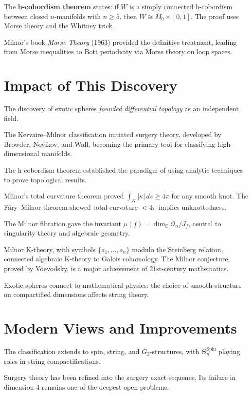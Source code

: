 The \textbf{h-cobordism theorem} states: if $W$ is a simply connected h-cobordism
between closed $n$-manifolds with $n \geq 5$, then $W \cong M_0 \times [0,1]$.
The proof uses Morse theory and the Whitney trick.

Milnor's book \emph{Morse Theory} (1963) provided the definitive treatment,
leading from Morse inequalities to Bott periodicity via Morse theory on loop
spaces.

\section{Impact of This Discovery}

The discovery of exotic spheres \emph{founded differential topology} as an
independent field.

The Kervaire--Milnor classification initiated surgery theory, developed by
Browder, Novikov, and Wall, becoming the primary tool for classifying
high-dimensional manifolds.

The h-cobordism theorem established the paradigm of using analytic techniques to
prove topological results.

Milnor's total curvature theorem proved $\int_K |\kappa|\, ds \geq 4\pi$ for any
smooth knot. The Fáry--Milnor theorem showed total curvature $< 4\pi$ implies
unknottedness.

The Milnor fibration gave the invariant $\mu(f) = \dim_\mathbb{C} \mathcal{O}_n /
J_f$, central to singularity theory and algebraic geometry.

Milnor K-theory, with symbols $\{a_1, \ldots, a_n\}$ modulo the Steinberg
relation, connected algebraic K-theory to Galois cohomology. The Milnor conjecture,
proved by Voevodsky, is a major achievement of 21st-century mathematics.

Exotic spheres connect to mathematical physics: the choice of smooth structure on
compactified dimensions affects string theory.

\section{Modern Views and Improvements}

The classification extends to spin, string, and $G_2$-structures, with
$\Theta_n^{\text{Spin}}$ playing roles in string compactifications.

Surgery theory has been refined into the surgery exact sequence. Its failure in
dimension 4 remains one of the deepest open problems.


